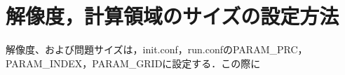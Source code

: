 












\section{解像度，計算領域のサイズの設定方法}
解像度、および問題サイズは，init.conf，run.confのPARAM\_PRC，PARAM\_INDEX，PARAM\_GRIDに設定する．この際に

